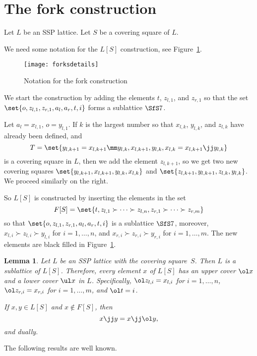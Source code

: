 \documentclass{amsart}
\theoremstyle{plain}
\newtheorem{lemma}[theorem]{Lemma}
\theoremstyle{definition}
\begin{document}
\section{The fork construction}\label{S:forks}

Let $L$ be an SSP lattice. 
Let $S$ be a covering square of $L$.

We need some notation for the $L[S]$ construction, 
see Figure~\ref{F:forksdetails}. 

\begin{figure}[h]
\centerline{\texttt{[image: forksdetails]}}
\caption{Notation for the fork construction}\label{F:forksdetails}
\end{figure}

We start the construction 
by adding the elements $t$, $z_{l,1}$, and $z_{r,1}$
so that the set $\set{o, z_{l,1}, z_{r,1}, a_l, a_r, t,i}$ 
forms a sublattice $\SfS 7$.

Let $a_l = x_{l,1}$, $o = y_{l,1}$. 
If $k$ is the largest number so that 
$x_{l,k}$, $y_{l,k}$, and $z_{l,k}$ have already been defined, and
\[
   T = \set{y_{l,k+1} = x_{l,k+1} \mm y_{l,k}, x_{l,k+1}, y_{l,k},
    x_{l,k} = x_{l,k+1} \jj y_{l,k}}
\]
is a covering square in $L$, then we add the element $z_{l,k+1}$,
so we get two new covering squares 
$\set{y_{l,k+1}, x_{l,k+1}, y_{l,k}, x_{l,k}}$
and $\set{z_{l,k+1}, y_{l,k+1}, z_{l,k}, y_{l,k}}$.
We proceed similarly on the right.

So $L[S]$ is constructed by inserting the elements in the set
\[
   F[S] = \set{t,z_{l,1} \succ \dots \succ z_{l,n}, 
          z_{r,1} \succ \dots \succ z_{r,m}}
\]
so that $\set{o, z_{l,1}, z_{r,1}, a_l, a_r, t,i}$ 
is a sublattice $\SfS 7$,
moreover, $x_{l,i} \succ z_{l,i} \succ y_{l,i}$ for $i = 1, \dots, n$, and $x_{r,i} \succ z_{r,i} \succ y_{r,i}$ for $i = 1, \dots, m$.
The new elements are black filled in Figure~\ref{F:forksdetails}.  

\begin{lemma}\label{L:easy}
Let $L$ be an SSP lattice with the covering square~$S$.
Then $L$ is a sublattice of $L[S]$. 
Therefore, every element $x$ of $L[S]$ 
has an upper cover $\ol x$ and a lower cover $\ul x$ in $L$.
Specifically, $\ol z_{l,i} = x_{l,i}$ for $i = 1, \dots, n$,
$\ol z_{r,i} = x_{r,i}$ for $i = 1, \dots, m$, and $\ol t = i$.

If $x, y \in L[S]$ and $x \nin F[S]$, then 
\[
   x \jj y = x \jj \ol y,
\]
and dually.
\end{lemma}

The following results are well known.
\end{document}
